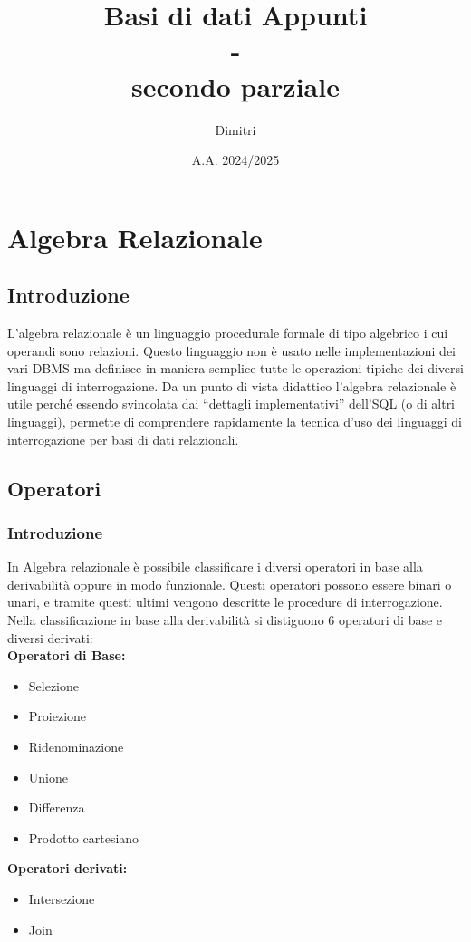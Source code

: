 \documentclass{report}
\title{Basi di dati Appunti\\ -\\ secondo parziale}
\author{Dimitri}
\date{A.A. 2024/2025}
\begin{document}
\maketitle
\newpage
\tableofcontents
\newpage

\chapter{Algebra Relazionale}
\section{Introduzione}
L'algebra relazionale è un linguaggio procedurale formale di tipo algebrico i cui operandi sono relazioni.
Questo linguaggio non è usato nelle implementazioni dei vari DBMS ma definisce in maniera semplice tutte le operazioni tipiche dei diversi linguaggi di interrogazione.
Da un punto di vista didattico l’algebra relazionale è utile perché essendo svincolata dai “dettagli
implementativi” dell’SQL (o di altri linguaggi), permette di comprendere rapidamente la tecnica d’uso dei linguaggi di interrogazione per basi di dati relazionali.\\
\section{Operatori}
\subsection{Introduzione}
In Algebra relazionale è possibile classificare i diversi operatori in base alla derivabilità oppure in modo funzionale. Questi operatori possono essere binari o unari, e tramite questi ultimi vengono descritte le procedure di interrogazione.\\
Nella classificazione in base alla derivabilità si distiguono 6 operatori di base e diversi derivati:\\
\textbf{Operatori di Base:}
\begin{itemize}
    \item Selezione
    \item Proiezione
    \item Ridenominazione
    \item Unione
    \item Differenza
    \item Prodotto cartesiano
\end{itemize}
\textbf{Operatori derivati:}
\begin{itemize}
    \item Intersezione
    \item Join
\end{itemize}
\newpage
\end{document}
